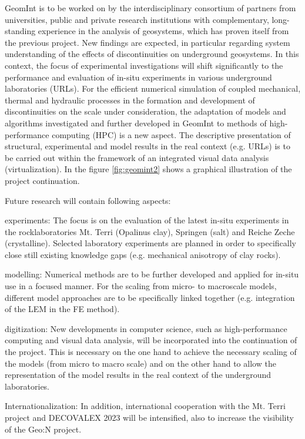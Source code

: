 GeomInt is to be worked on by the interdisciplinary consortium of partners from universities, public and private research institutions with complementary, long-standing experience in the analysis of geosystems, which has proven itself from the previous project. New findings are expected, in particular regarding system understanding of the effects of discontinuities on underground geosystems. In this context, the focus of experimental investigations will shift significantly to the performance and evaluation of in-situ experiments in various underground laboratories (URLs). For the efficient numerical simulation of coupled mechanical, thermal and hydraulic processes in the formation and development of discontinuities on the scale under consideration, the adaptation of models and algorithms investigated and further developed in GeomInt to methods of high-performance computing (HPC) is a new aspect. The descriptive presentation of structural, experimental and model results in the real context (e.g. URLs) is to be carried out within the framework of an integrated visual data analysis (virtualization).
In the figure \ref{fig:geomint2} shows a graphical illustration of the project continuation.

Future research will contain following aspects:
\begin{list}{--}{\leftmargin=1em \itemindent=0em \itemsep=-0.5em}
\item experiments: The focus is on the evaluation of the latest in-situ experiments in the rock\-laboratories Mt. Terri (Opalinus clay), Springen (salt) and Reiche Zeche (crystalline). Selected laboratory experiments are planned in order to specifically close still existing knowledge gaps (e.g. mechanical anisotropy of clay rocks).
\item modelling: Numerical methods are to be further developed and applied for in-situ use in a focused manner. For the scaling from micro- to macroscale models, different model approaches are to be specifically linked together (e.g. integration of the LEM in the FE method).
\item digitization: New developments in computer science, such as high-performance computing and visual data analysis, will be incorporated into the continuation of the project. This is necessary on the one hand to achieve the necessary scaling of the models (from micro to macro scale) and on the other hand to allow the representation of the model results in the real context of the underground laboratories.
\item Internationalization: In addition, international cooperation with the Mt. Terri project and DECOVALEX 2023 will be intensified, also to increase the visibility of the Geo:N project.
\end{list}

